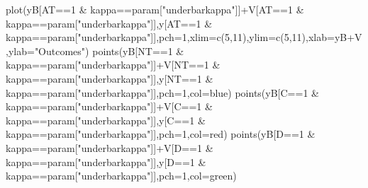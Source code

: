\documentclass[
]{book}
\newenvironment{Shaded}{\begin{snugshade}}{\end{snugshade}}
\newcommand{\AttributeTok}[1]{\textcolor[rgb]{0.77,0.63,0.00}{#1}}
\newcommand{\DecValTok}[1]{\textcolor[rgb]{0.00,0.00,0.81}{#1}}
\newcommand{\FunctionTok}[1]{\textcolor[rgb]{0.00,0.00,0.00}{#1}}
\newcommand{\NormalTok}[1]{#1}
\newcommand{\SpecialCharTok}[1]{\textcolor[rgb]{0.00,0.00,0.00}{#1}}
\newcommand{\StringTok}[1]{\textcolor[rgb]{0.31,0.60,0.02}{#1}}
\theoremstyle{definition}
\theoremstyle{definition}
\theoremstyle{definition}
\theoremstyle{definition}
\theoremstyle{remark}
\begin{document}
\begin{Shaded}
\begin{Highlighting}[]
\FunctionTok{plot}\NormalTok{(yB[AT}\SpecialCharTok{==}\DecValTok{1} \SpecialCharTok{\&}\NormalTok{ kappa}\SpecialCharTok{==}\NormalTok{param[}\StringTok{"underbarkappa"}\NormalTok{]]}\SpecialCharTok{+}\NormalTok{V[AT}\SpecialCharTok{==}\DecValTok{1} \SpecialCharTok{\&}\NormalTok{ kappa}\SpecialCharTok{==}\NormalTok{param[}\StringTok{"underbarkappa"}\NormalTok{]],y[AT}\SpecialCharTok{==}\DecValTok{1} \SpecialCharTok{\&}\NormalTok{ kappa}\SpecialCharTok{==}\NormalTok{param[}\StringTok{"underbarkappa"}\NormalTok{]],}\AttributeTok{pch=}\DecValTok{1}\NormalTok{,}\AttributeTok{xlim=}\FunctionTok{c}\NormalTok{(}\DecValTok{5}\NormalTok{,}\DecValTok{11}\NormalTok{),}\AttributeTok{ylim=}\FunctionTok{c}\NormalTok{(}\DecValTok{5}\NormalTok{,}\DecValTok{11}\NormalTok{),}\AttributeTok{xlab=}\StringTok{\textquotesingle{}yB+V\textquotesingle{}}\NormalTok{,}\AttributeTok{ylab=}\StringTok{"Outcomes"}\NormalTok{)}
\FunctionTok{points}\NormalTok{(yB[NT}\SpecialCharTok{==}\DecValTok{1} \SpecialCharTok{\&}\NormalTok{ kappa}\SpecialCharTok{==}\NormalTok{param[}\StringTok{"underbarkappa"}\NormalTok{]]}\SpecialCharTok{+}\NormalTok{V[NT}\SpecialCharTok{==}\DecValTok{1} \SpecialCharTok{\&}\NormalTok{ kappa}\SpecialCharTok{==}\NormalTok{param[}\StringTok{"underbarkappa"}\NormalTok{]],y[NT}\SpecialCharTok{==}\DecValTok{1} \SpecialCharTok{\&}\NormalTok{ kappa}\SpecialCharTok{==}\NormalTok{param[}\StringTok{"underbarkappa"}\NormalTok{]],}\AttributeTok{pch=}\DecValTok{1}\NormalTok{,}\AttributeTok{col=}\StringTok{\textquotesingle{}blue\textquotesingle{}}\NormalTok{)}
\FunctionTok{points}\NormalTok{(yB[C}\SpecialCharTok{==}\DecValTok{1} \SpecialCharTok{\&}\NormalTok{ kappa}\SpecialCharTok{==}\NormalTok{param[}\StringTok{"underbarkappa"}\NormalTok{]]}\SpecialCharTok{+}\NormalTok{V[C}\SpecialCharTok{==}\DecValTok{1} \SpecialCharTok{\&}\NormalTok{ kappa}\SpecialCharTok{==}\NormalTok{param[}\StringTok{"underbarkappa"}\NormalTok{]],y[C}\SpecialCharTok{==}\DecValTok{1} \SpecialCharTok{\&}\NormalTok{ kappa}\SpecialCharTok{==}\NormalTok{param[}\StringTok{"underbarkappa"}\NormalTok{]],}\AttributeTok{pch=}\DecValTok{1}\NormalTok{,}\AttributeTok{col=}\StringTok{\textquotesingle{}red\textquotesingle{}}\NormalTok{)}
\FunctionTok{points}\NormalTok{(yB[D}\SpecialCharTok{==}\DecValTok{1} \SpecialCharTok{\&}\NormalTok{ kappa}\SpecialCharTok{==}\NormalTok{param[}\StringTok{"underbarkappa"}\NormalTok{]]}\SpecialCharTok{+}\NormalTok{V[D}\SpecialCharTok{==}\DecValTok{1} \SpecialCharTok{\&}\NormalTok{ kappa}\SpecialCharTok{==}\NormalTok{param[}\StringTok{"underbarkappa"}\NormalTok{]],y[D}\SpecialCharTok{==}\DecValTok{1} \SpecialCharTok{\&}\NormalTok{ kappa}\SpecialCharTok{==}\NormalTok{param[}\StringTok{"underbarkappa"}\NormalTok{]],}\AttributeTok{pch=}\DecValTok{1}\NormalTok{,}\AttributeTok{col=}\StringTok{\textquotesingle{}green\textquotesingle{}}\NormalTok{)}

\end{Highlighting}
\end{Shaded}
\end{document}
